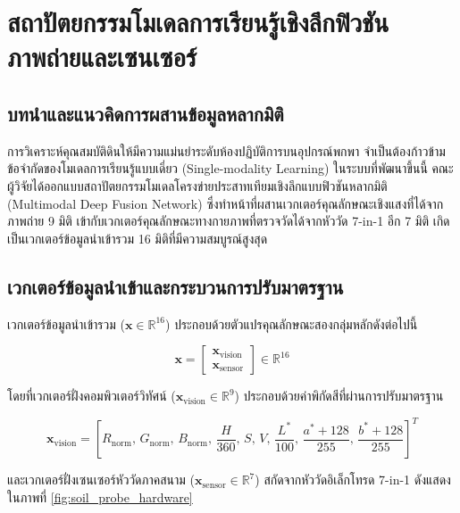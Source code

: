 \chapter{สถาปัตยกรรมโมเดลการเรียนรู้เชิงลึกฟิวชันภาพถ่ายและเซนเซอร์}
\label{ch:multimodal_deep_learning}

\section{บทนำและแนวคิดการผสานข้อมูลหลากมิติ}

การวิเคราะห์คุณสมบัติดินให้มีความแม่นยำระดับห้องปฏิบัติการบนอุปกรณ์พกพา จำเป็นต้องก้าวข้ามข้อจำกัดของโมเดลการเรียนรู้แบบเดี่ยว (Single-modality Learning) ในระบบที่พัฒนาขึ้นนี้ คณะผู้วิจัยได้ออกแบบสถาปัตยกรรมโมเดลโครงข่ายประสาทเทียมเชิงลึกแบบฟิวชันหลากมิติ (Multimodal Deep Fusion Network) ซึ่งทำหน้าที่ผสานเวกเตอร์คุณลักษณะเชิงแสงที่ได้จากภาพถ่าย 9 มิติ เข้ากับเวกเตอร์คุณลักษณะทางกายภาพที่ตรวจวัดได้จากหัววัด 7-in-1 อีก 7 มิติ เกิดเป็นเวกเตอร์ข้อมูลนำเข้ารวม 16 มิติที่มีความสมบูรณ์สูงสุด

\section{เวกเตอร์ข้อมูลนำเข้าและกระบวนการปรับมาตรฐาน}

เวกเตอร์ข้อมูลนำเข้ารวม ($\mathbf{x} \in \mathbb{R}^{16}$) ประกอบด้วยตัวแปรคุณลักษณะสองกลุ่มหลักดังต่อไปนี้

\begin{equation}
\mathbf{x} = \begin{bmatrix} \mathbf{x}_{\text{vision}} \\ \mathbf{x}_{\text{sensor}} \end{bmatrix} \in \mathbb{R}^{16}
\end{equation}

โดยที่เวกเตอร์ฝั่งคอมพิวเตอร์วิทัศน์ ($\mathbf{x}_{\text{vision}} \in \mathbb{R}^9$) ประกอบด้วยค่าพิกัดสีที่ผ่านการปรับมาตรฐาน

\begin{equation}
\mathbf{x}_{\text{vision}} = \left[ R_{\text{norm}}, \, G_{\text{norm}}, \, B_{\text{norm}}, \, \frac{H}{360}, \, S, \, V, \, \frac{L^*}{100}, \, \frac{a^* + 128}{255}, \, \frac{b^* + 128}{255} \right]^T
\end{equation}

และเวกเตอร์ฝั่งเซนเซอร์หัววัดภาคสนาม ($\mathbf{x}_{\text{sensor}} \in \mathbb{R}^7$) สกัดจากหัววัดอิเล็กโทรด 7-in-1 ดังแสดงในภาพที่ \ref{fig:soil_probe_hardware}

